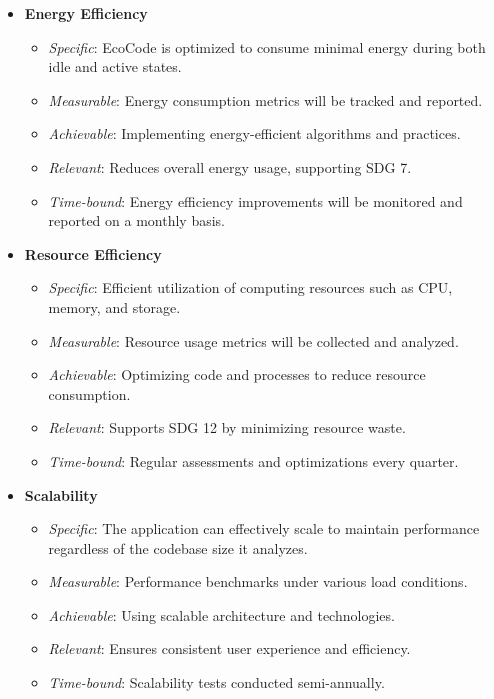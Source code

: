 \documentclass[conference,compsoc]{IEEEtran}
\begin{document}
\begin{itemize}
	\item \textbf{Energy Efficiency}
	      \begin{itemize}
		      \item \textit{Specific}: EcoCode is optimized to consume minimal energy during both idle and active states.
		      \item \textit{Measurable}: Energy consumption metrics will be tracked and reported.
		      \item \textit{Achievable}: Implementing energy-efficient algorithms and practices.
		      \item \textit{Relevant}: Reduces overall energy usage, supporting SDG 7.
		      \item \textit{Time-bound}: Energy efficiency improvements will be monitored and reported on a monthly basis.
	      \end{itemize}

	\item \textbf{Resource Efficiency}
	      \begin{itemize}
		      \item \textit{Specific}: Efficient utilization of computing resources such as CPU, memory, and storage.
		      \item \textit{Measurable}: Resource usage metrics will be collected and analyzed.
		      \item \textit{Achievable}: Optimizing code and processes to reduce resource consumption.
		      \item \textit{Relevant}: Supports SDG 12 by minimizing resource waste.
		      \item \textit{Time-bound}: Regular assessments and optimizations every quarter.
	      \end{itemize}

	\item \textbf{Scalability}
	      \begin{itemize}
		      \item \textit{Specific}: The application can effectively scale to maintain performance regardless of the codebase size it analyzes.
		      \item \textit{Measurable}: Performance benchmarks under various load conditions.
		      \item \textit{Achievable}: Using scalable architecture and technologies.
		      \item \textit{Relevant}: Ensures consistent user experience and efficiency.
		      \item \textit{Time-bound}: Scalability tests conducted semi-annually.
	      \end{itemize}


\end{itemize}
\end{document}

